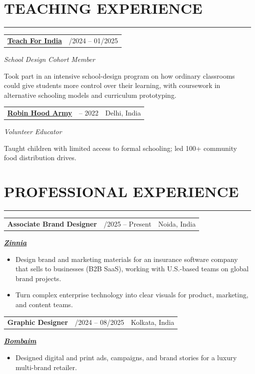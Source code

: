 \documentclass[10pt,letterpaper]{article}
\makeatletter
\newcommand{\weblink}[2]{\href{#1}{\textbf{#2}}}
\newcommand{\sectionrule}{\par\vspace{-2pt}\noindent\rule{\linewidth}{0.4pt}\par\vspace{2pt}}
\newcommand{\body}[1]{{\setlength{\rightskip}{2.7em}#1\par}}
\newenvironment{spread}[2][\normalsize]{\par\begingroup\linespread{#2}#1\selectfont}{\par\endgroup}
\newcommand{\entry}[2]{%
  \par\noindent
  \begin{tabularx}{\linewidth}{@{}X r@{}}
    \textbf{#1} & \normalfont #2
  \end{tabularx}\par
}
\newcommand{\entrygap}{\vspace{5pt}}
\newcommand{\subline}[1]{{\setlength{\rightskip}{2.7em}\itshape\small #1\par}\vspace{1pt}}
\makeatother
\begin{document}
\ifdefined\EDRES\begin{spread}{1.03}\else\begin{spread}{1.07}\fi
\section{\MakeUppercase{Teaching Experience}}
\sectionrule

\entry{\weblink{https://linkedin.com/in/hiamritaa}{Teach For India}}{10/2024 -- 01/2025}
\subline{School Design Cohort Member}
\body{Took part in an intensive school-design program on how ordinary classrooms could give students more control over their learning, with coursework in alternative schooling models and curriculum prototyping.}

\entrygap
{}
\entry{\weblink{https://robinhoodarmy.com/}{Robin Hood Army}}{2021 -- 2022~\textbar\ Delhi, India}
\subline{Volunteer Educator}
\body{Taught children with limited access to formal schooling; led 100+ community food distribution drives.}

\section{\MakeUppercase{Professional Experience}}
\sectionrule

\entry{Associate Brand Designer}{09/2025 -- Present~\textbar\ Noida, India}
\subline{\weblink{https://zinnia.com/en}{Zinnia}}
\begin{itemize}
  \item Design brand and marketing materials for an insurance software company that sells to businesses (B2B SaaS), working with U.S.-based teams on global brand projects.
  \item Turn complex enterprise technology into clear visuals for product, marketing, and content teams.
\end{itemize}

\entrygap
{}
\entry{Graphic Designer}{09/2024 -- 08/2025~\textbar\ Kolkata, India}
\subline{\weblink{https://bombaim.in/}{Bombaim}}
\begin{itemize}
  \item Designed digital and print ads, campaigns, and brand stories for a luxury multi-brand retailer.
\end{itemize}


\end{spread}
\end{spread}
\end{document}
